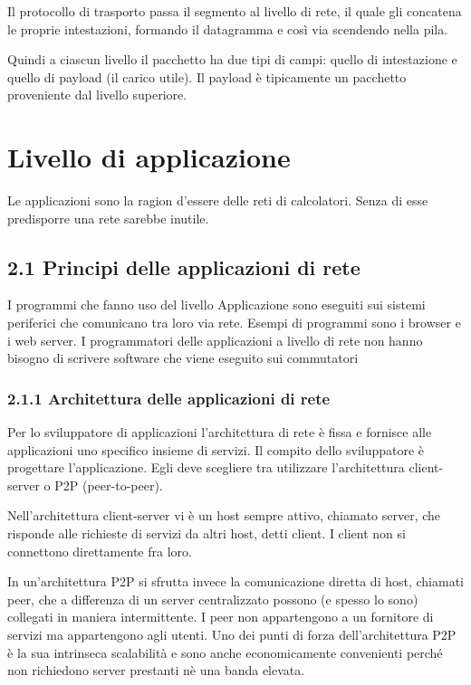 \documentclass{book}
\begin{document}
Il protocollo di trasporto passa il segmento al livello di rete, il quale gli concatena le proprie intestazioni, formando il datagramma e così via scendendo nella pila.

Quindi a ciascun livello il pacchetto ha due tipi di campi: quello di intestazione e quello di payload (il carico utile). Il payload è tipicamente un pacchetto proveniente dal livello superiore.

\chapter{Livello di applicazione}
Le applicazioni sono la ragion d'essere delle reti di calcolatori. Senza di esse predisporre una rete sarebbe inutile.

\section*{2.1 Principi delle applicazioni di rete}
I programmi che fanno uso del livello Applicazione sono eseguiti sui sistemi periferici che comunicano tra loro via rete. Esempi di programmi sono i browser e i web server. I programmatori delle applicazioni a livello di rete non hanno bisogno di scrivere software che viene eseguito sui commutatori

\subsection*{2.1.1 Architettura delle applicazioni di rete}
Per lo sviluppatore di applicazioni l'architettura di rete è fissa e fornisce alle applicazioni uno specifico insieme di servizi. Il compito dello sviluppatore è progettare l'applicazione. Egli deve scegliere tra utilizzare l'architettura client-server o P2P (peer-to-peer).

Nell'architettura client-server vi è un host sempre attivo, chiamato server, che risponde alle richieste di servizi da altri host, detti client. I client non si connettono direttamente fra loro.

In un'architettura P2P si sfrutta invece la comunicazione diretta di host, chiamati peer, che a differenza di un server centralizzato possono (e spesso lo sono) collegati in maniera intermittente. I peer non appartengono a un fornitore di servizi ma appartengono agli utenti. Uno dei punti di forza dell'architettura P2P è la sua intrinseca scalabilità e sono anche economicamente convenienti perché non richiedono server prestanti nè una banda elevata.
\end{document}
